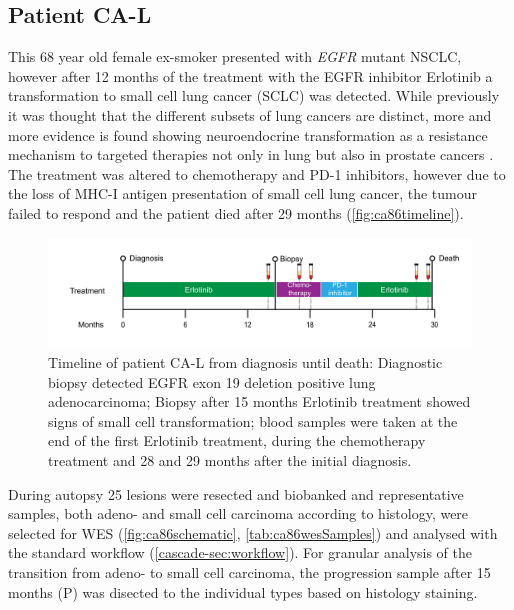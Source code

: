
\subsection{Patient CA-L}
\label{cascade-sec:CA86}

This 68 year old female ex-smoker presented with \textit{EGFR} mutant NSCLC, however after 12 months of the treatment with the EGFR inhibitor Erlotinib a transformation to small cell lung cancer (SCLC) was detected. While previously it was thought that the different subsets of lung cancers are distinct, more and more evidence is found showing neuroendocrine transformation as a resistance mechanism to targeted therapies not only in lung but also in prostate cancers \cite{Oser2015,Aggarwal2018}. The treatment was altered to chemotherapy and PD-1 inhibitors, however due to the loss of MHC-I antigen presentation of small cell lung cancer, the tumour failed to respond \cite{Burr2019} and the patient died after 29 months (\autoref{fig:ca86timeline}).

\begin{figure}[ht]
\centering
\includegraphics[width=.99\linewidth]{Figures/CASCADE/CA86/CA-L_timeline}
\caption[Timeline of patient CA-L from diagnosis until death]{Timeline of patient CA-L from diagnosis until death: Diagnostic biopsy detected EGFR exon 19 deletion positive lung adenocarcinoma;  Biopsy after 15 months Erlotinib treatment showed signs of small cell transformation; blood samples were taken at the end of the first Erlotinib treatment, during the chemotherapy treatment and 28 and 29 months after the initial diagnosis.} \label{fig:ca86timeline}
\end{figure}

During autopsy 25 lesions were resected and biobanked and representative samples, both adeno- and small cell carcinoma according to histology, were selected for WES (\autoref{fig:ca86schematic}, \autoref{tab:ca86wesSamples}) and analysed with the standard workflow (\autoref{cascade-sec:workflow}). For granular analysis of the transition from adeno- to small cell carcinoma, the progression sample after 15 months (P) was disected to the individual types based on histology staining.


